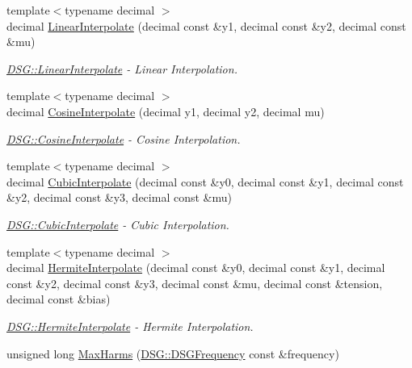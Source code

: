 \begin{DoxyCompactItemize}
{\footnotesize template$<$typename decimal $>$ }\\decimal \hyperlink{namespace_d_s_g_af4448472776648fb65623fd29eed262f}{Linear\+Interpolate} (decimal const \&y1, decimal const \&y2, decimal const \&mu)
\begin{DoxyCompactList}\small\item\em \hyperlink{namespace_d_s_g_af4448472776648fb65623fd29eed262f}{D\+S\+G\+::\+Linear\+Interpolate} -\/ Linear Interpolation. \end{DoxyCompactList}\item 
{\footnotesize template$<$typename decimal $>$ }\\decimal \hyperlink{namespace_d_s_g_a293229b6a440ddf9cc87e9a76d322d43}{Cosine\+Interpolate} (decimal y1, decimal y2, decimal mu)
\begin{DoxyCompactList}\small\item\em \hyperlink{namespace_d_s_g_a293229b6a440ddf9cc87e9a76d322d43}{D\+S\+G\+::\+Cosine\+Interpolate} -\/ Cosine Interpolation. \end{DoxyCompactList}\item 
{\footnotesize template$<$typename decimal $>$ }\\decimal \hyperlink{namespace_d_s_g_a7c61e97fb15300de270eb32d51cdc849}{Cubic\+Interpolate} (decimal const \&y0, decimal const \&y1, decimal const \&y2, decimal const \&y3, decimal const \&mu)
\begin{DoxyCompactList}\small\item\em \hyperlink{namespace_d_s_g_a7c61e97fb15300de270eb32d51cdc849}{D\+S\+G\+::\+Cubic\+Interpolate} -\/ Cubic Interpolation. \end{DoxyCompactList}\item 
{\footnotesize template$<$typename decimal $>$ }\\decimal \hyperlink{namespace_d_s_g_ae1b0502c523a1a123bdde9aa33ebbb77}{Hermite\+Interpolate} (decimal const \&y0, decimal const \&y1, decimal const \&y2, decimal const \&y3, decimal const \&mu, decimal const \&tension, decimal const \&bias)
\begin{DoxyCompactList}\small\item\em \hyperlink{namespace_d_s_g_ae1b0502c523a1a123bdde9aa33ebbb77}{D\+S\+G\+::\+Hermite\+Interpolate} -\/ Hermite Interpolation. \end{DoxyCompactList}\item 
unsigned long \hyperlink{namespace_d_s_g_ab5c4eea42ea10b69cfc32afb83ff1d0d}{Max\+Harms} (\hyperlink{namespace_d_s_g_a4315a061386fa1014fda09b15d3a6973}{D\+S\+G\+::\+D\+S\+G\+Frequency} const \&frequency)

\end{DoxyCompactItemize}
